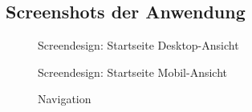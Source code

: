 \subsection{Screenshots der Anwendung}
\label{Screenshots}

\begin{figure}[h]
\centering
{}
\caption{Screendesign: Startseite Desktop-Ansicht}
\end{figure}


\begin{figure}[h]
\centering
{}
\caption{Screendesign: Startseite Mobil-Ansicht}
\end{figure}

\begin{figure}[h]
\centering
{}
\caption{Navigation}
\end{figure}

\clearpage
